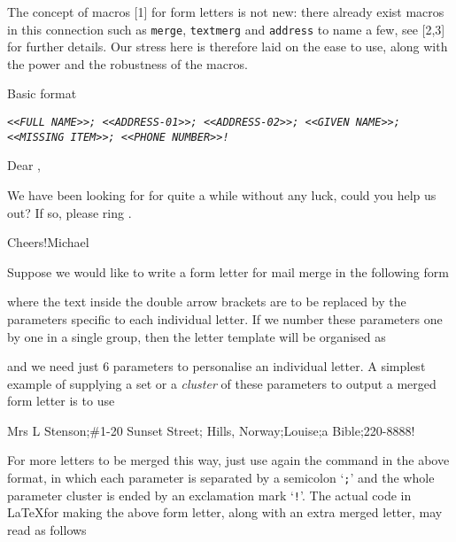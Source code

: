 {\medskip

The concept of macros [1] for form letters is not new: there already
exist macros in this connection such as {\tt merge}, {\tt textmerg} and
{\tt address} to name a few, see [2,3] for further details. Our stress
here is therefore laid on the ease to use, along with the power and the
robustness of the macros.

\bigskip


{\lbold Basic format}



  \beginletter
\sl
\hsize=3.1in\relax
\medskip
  \paranames             %
    \tt<<FULL NAME>>;%
    \tt<<ADDRESS-01>>;%
    \tt<<ADDRESS-02>>;%
    \tt<<GIVEN NAME>>;%
    \tt<<MISSING ITEM>>;%
    \tt<<PHONE NUMBER>>!
  \loaddefaultparas      %

  \NOPAGENUMBERS\parindent=0pt\overfullrule=0pt
  \paras[1]\par\paras[2]\par\paras[3]\par\medskip

  Dear \paras[4],

  \smallskip
  We have been looking for
  \paras[5] for quite a while
  without any luck, could you help
  us out? If so, please ring
  \paras[6]. \par\medskip
  Cheers!\hfill Michael\par %
\medskip
  \endletter



Suppose we would like to write a form letter for mail merge in the
following form

\showparas

where the text inside the double arrow brackets are to be replaced by
the parameters specific to each individual letter. If we number these
parameters one by one in a single group, then the letter template will
be organised as

\preview

and we need just 6 parameters to personalise an individual letter. A
simplest example of supplying a set or a {\sl cluster} of these
parameters to output a merged form letter is to use

\setraw
\moreletter
  Mrs L Stenson;\#1-20 Sunset Street;%
  Hills, Norway;Louise;a Bible;220-8888!
\unsetraw

For more letters to be merged this way, just use again the
command {\tt\string\moreletter} in the above format, in which each
parameter is separated by a semicolon `{\tt ;}' and the whole parameter
cluster is ended by an exclamation mark `{\tt !}'. The actual code in
\LaTeX\space for making the above form letter, along with an extra
merged letter, may read as follows


}
